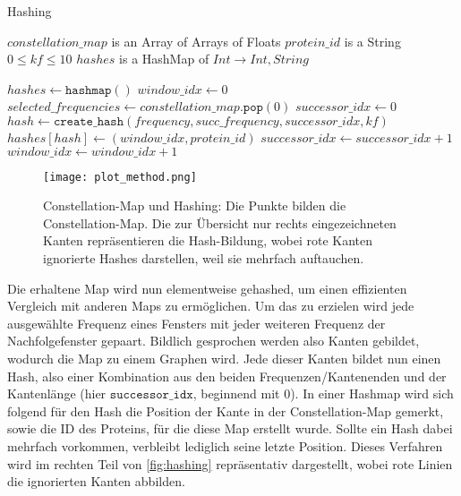         \newpage
        \begin{algorithm}
            \caption{Hashing}\label{alg:strukturdaten}
            \begin{algorithmic}
                \Require $constellation\_map$ is an Array of Arrays of Floats
                \Require $protein\_id$ is a String
                \Require $0 \leq kf \leq 10$
                \Ensure $hashes$ is a HashMap of $Int \rightarrow Int, String$

                \State $hashes \gets \texttt{hashmap}()$
                \State $window\_idx \gets 0$
                \Repeat
                    \State $selected\_frequencies \gets constellation\_map.\texttt{pop}(0)$
                        \State $successor\_idx \gets 0$
                                \State $hash \gets \texttt{create\_hash}(frequency, succ\_frequency, successor\_idx, kf)$
                                \State $hashes[hash] \gets (window\_idx, protein\_id)$
                            \EndFor
                        \EndFor
                        \State $successor\_idx \gets successor\_idx + 1$
                    \EndFor
                    \State $window\_idx \gets window\_idx + 1$
            \end{algorithmic}
        \end{algorithm}

        \begin{figure}[H]
            \centering
            \texttt{[image: plot\_method.png]}
            \caption{Constellation-Map und Hashing: Die Punkte bilden die Constellation-Map. Die zur Übersicht nur rechts eingezeichneten Kanten repräsentieren die Hash-Bildung, wobei rote Kanten ignorierte Hashes darstellen, weil sie mehrfach auftauchen.}
            \label{fig:hashing}
        \end{figure}

        Die erhaltene Map wird nun elementweise gehashed, um einen effizienten Vergleich mit anderen Maps zu ermöglichen. Um das zu erzielen wird jede ausgewählte Frequenz eines Fensters mit jeder weiteren Frequenz der Nachfolgefenster gepaart. Bildlich gesprochen werden also Kanten gebildet, wodurch die Map zu einem Graphen wird. Jede dieser Kanten bildet nun einen Hash, also einer Kombination aus den beiden Frequenzen/Kantenenden und der Kantenlänge (hier $\texttt{successor\_idx}$, beginnend mit 0). In einer Hashmap wird sich folgend für den Hash die Position der Kante in der Constellation-Map gemerkt, sowie die ID des Proteins, für die diese Map erstellt wurde. Sollte ein Hash dabei mehrfach vorkommen, verbleibt lediglich seine letzte Position. Dieses Verfahren wird im rechten Teil von \autoref{fig:hashing} repräsentativ dargestellt, wobei rote Linien die ignorierten Kanten abbilden.

